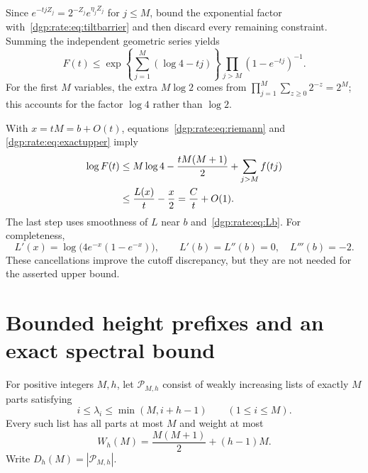 \documentclass[11pt,letterpaper]{article}
\numberwithin{equation}{section}
\theoremstyle{remark}\newtheorem{remark}[theorem]{Remark}
\begin{document}
Since $e^{-tjZ_j}=2^{-Z_j}e^{\eta_jZ_j}$ for $j\leq M$, bound the
exponential factor with~\eqref{dgp:rate:eq:tiltbarrier} and then discard every
remaining constraint. Summing the independent geometric series yields
\begin{equation}\label{dgp:rate:eq:exactupper}
 F(t)\leq
 \exp\!\left\{\sum_{j=1}^M(\log4-tj)\right\}
 \prod_{j>M}(1-e^{-tj})^{-1}.
\end{equation}
For the first $M$ variables, the extra $M\log2$ comes from
$\prod_{j=1}^M\sum_{z\geq0}2^{-z}=2^M$; this accounts for the factor
$\log4$ rather than $\log2$.

With $x=tM=b+O(t)$, equations~\eqref{dgp:rate:eq:riemann} and
\eqref{dgp:rate:eq:exactupper} imply
\begin{align}
 \log F(t)&\leq M\log4-\frac{tM(M+1)}2+\sum_{j>M}f(tj)\notag\\
 &\leq\frac{L(x)}t-\frac x2
  =\frac Ct+O(1).\label{dgp:rate:eq:upperfinal}
\end{align}
The last step uses smoothness of $L$ near $b$ and~\eqref{dgp:rate:eq:Lb}.
For completeness,
\[
 L'(x)=\log\!\bigl(4e^{-x}(1-e^{-x})\bigr),\qquad
 L'(b)=L''(b)=0,\quad L'''(b)=-2.
\]
These cancellations improve the cutoff discrepancy, but they are not
needed for the asserted upper bound.

\section{Bounded height prefixes and an exact spectral bound}\label{dgp:rate:sec:prefix}
For positive integers $M,h$, let $\mathcal P_{M,h}$ consist of weakly
increasing lists of exactly $M$ parts satisfying
\begin{equation}\label{dgp:rate:eq:prefix}
 i\leq\lambda_i\leq\min(M,i+h-1)\qquad(1\leq i\leq M).
\end{equation}
Every such list has all parts at most $M$ and weight at most
\begin{equation}\label{dgp:rate:eq:weight}
 W_h(M)=\frac{M(M+1)}2+(h-1)M.
\end{equation}
Write $D_h(M)=|\mathcal P_{M,h}|$.
\end{document}
